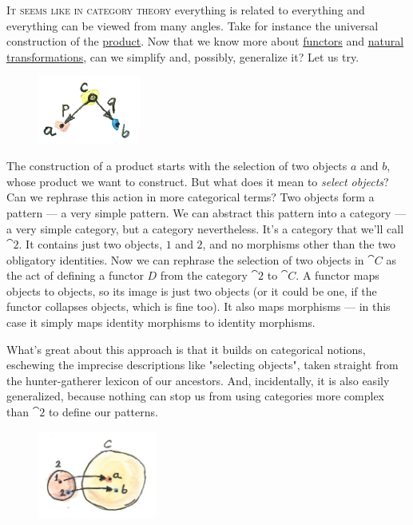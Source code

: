 
\lettrine[lhang=0.17]{I}{t seems like in category theory} everything is related to everything and
everything can be viewed from many angles. Take for instance the
universal construction of the \hyperref[products-and-coproducts]{product}.
Now that we know more about \hyperref[functors]{functors} and
\hyperref[natural-transformations]{natural transformations}, can we simplify and, possibly, generalize it? Let us
try.

\begin{figure}[H]
\centering
\includegraphics[width=0.3\textwidth]{images/productpattern.jpg}
\end{figure}

\noindent
The construction of a product starts with the selection of two objects
$a$ and $b$, whose product we want to construct. But what
does it mean to \emph{select objects}? Can we rephrase this action in
more categorical terms? Two objects form a pattern --- a very simple
pattern. We can abstract this pattern into a category --- a very simple
category, but a category nevertheless. It's a category that we'll call
$\cat{2}$. It contains just two objects, $1$ and $2$, and no morphisms
other than the two obligatory identities. Now we can rephrase the
selection of two objects in $\cat{C}$ as the act of defining a functor $D$
from the category $\cat{2}$ to $\cat{C}$. A functor maps objects to
objects, so its image is just two objects (or it could be one, if the
functor collapses objects, which is fine too). It also maps morphisms
--- in this case it simply maps identity morphisms to identity
morphisms.

What's great about this approach is that it builds on categorical
notions, eschewing the imprecise descriptions like "selecting
objects", taken straight from the hunter-gatherer lexicon of our
ancestors. And, incidentally, it is also easily generalized, because
nothing can stop us from using categories more complex than $\cat{2}$
to define our patterns.

\begin{figure}[H]
\centering
\includegraphics[width=0.35\textwidth]{images/two.jpg}
\end{figure}

